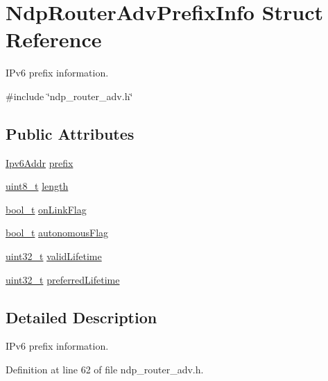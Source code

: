 \hypertarget{structNdpRouterAdvPrefixInfo}{}\section{Ndp\+Router\+Adv\+Prefix\+Info Struct Reference}
\label{structNdpRouterAdvPrefixInfo}


I\+Pv6 prefix information.  




{\ttfamily \#include \char`\"{}ndp\+\_\+router\+\_\+adv.\+h\char`\"{}}

\subsection*{Public Attributes}
\begin{DoxyCompactItemize}
\item 
\hyperlink{ipv6_8h_aed0cbc40c61ed5b4fb681ebc55237e89}{Ipv6\+Addr} \hyperlink{structNdpRouterAdvPrefixInfo_a31c0170d8af31c480eb758e417b9785c}{prefix}
\item 
\hyperlink{stdint_8h_aba7bc1797add20fe3efdf37ced1182c5}{uint8\+\_\+t} \hyperlink{structNdpRouterAdvPrefixInfo_a93ffb05a30099d8d4ff011db3b747612}{length}
\item 
\hyperlink{compiler__port_8h_a812d16e5494522586b3784e55d479912}{bool\+\_\+t} \hyperlink{structNdpRouterAdvPrefixInfo_ac2629873468323cc924d60276c76e463}{on\+Link\+Flag}
\item 
\hyperlink{compiler__port_8h_a812d16e5494522586b3784e55d479912}{bool\+\_\+t} \hyperlink{structNdpRouterAdvPrefixInfo_ac35ab34e8a0dba42f487884892cbe120}{autonomous\+Flag}
\item 
\hyperlink{stdint_8h_a435d1572bf3f880d55459d9805097f62}{uint32\+\_\+t} \hyperlink{structNdpRouterAdvPrefixInfo_a02104493db9c0cc0a4340e4e2b222639}{valid\+Lifetime}
\item 
\hyperlink{stdint_8h_a435d1572bf3f880d55459d9805097f62}{uint32\+\_\+t} \hyperlink{structNdpRouterAdvPrefixInfo_ad24e693aee55a8f655925fd66e7824d6}{preferred\+Lifetime}
\end{DoxyCompactItemize}


\subsection{Detailed Description}
I\+Pv6 prefix information. 

Definition at line 62 of file ndp\+\_\+router\+\_\+adv.\+h.



